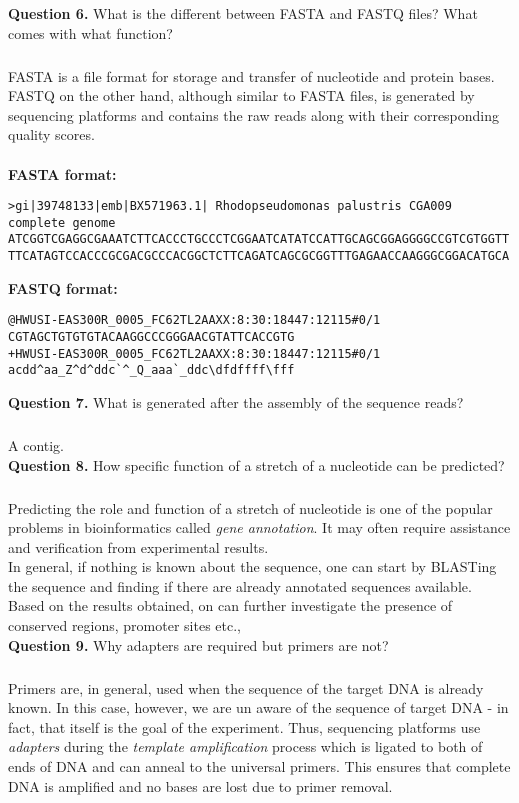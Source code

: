 \documentclass[12pt,a4paper]{report}
\begin{document}
\noindent
\textbf{Question 6.} What is the different between FASTA and FASTQ files? What 
comes with what function?
\subparagraph{} FASTA is a file format for storage and transfer of nucleotide 
and protein bases. FASTQ on the other hand, although similar to FASTA files, is 
generated by sequencing platforms and contains the raw reads along with their 
corresponding quality scores.\mbox{}\\\\
\textbf{FASTA format:}
\begin{verbatim}
>gi|39748133|emb|BX571963.1| Rhodopseudomonas palustris CGA009 complete genome
ATCGGTCGAGGCGAAATCTTCACCCTGCCCTCGGAATCATATCCATTGCAGCGGAGGGGCCGTCGTGGTT
TTCATAGTCCACCCGCGACGCCCACGGCTCTTCAGATCAGCGCGGTTTGAGAACCAAGGGCGGACATGCA
\end{verbatim}
\textbf{FASTQ format:}
\begin{verbatim}
@HWUSI-EAS300R_0005_FC62TL2AAXX:8:30:18447:12115#0/1
CGTAGCTGTGTGTACAAGGCCCGGGAACGTATTCACCGTG
+HWUSI-EAS300R_0005_FC62TL2AAXX:8:30:18447:12115#0/1
acdd^aa_Z^d^ddc`^_Q_aaa`_ddc\dfdffff\fff
\end{verbatim}
\noindent
\textbf{Question 7.} What is generated after the assembly of the sequence reads?
\subparagraph{} A contig.\mbox{}\\

\noindent
\textbf{Question 8.} How specific function of a stretch of a nucleotide can be
predicted?
\subparagraph{} Predicting the role and function of a stretch of nucleotide is 
one of the popular problems in bioinformatics called \textit{gene annotation}. 
It may often require assistance and verification from experimental results. \\ 
In general, if nothing is known about the sequence, one can start by BLASTing 
the sequence and finding if there are already annotated sequences available. 
Based on the results obtained, on can further investigate the presence of
conserved regions, promoter sites etc.,\mbox{}\\

\noindent
\textbf{Question 9.} Why adapters are required but primers are not?
\subparagraph{} Primers are, in general, used when the sequence of the target 
DNA is already known. In this case, however, we are un aware of the sequence of 
target DNA - in fact, that itself is the goal of the experiment. Thus, 
sequencing platforms use \textit{adapters} during the \textit{template 
amplification} process which is ligated to both of ends of DNA and can anneal 
to the universal primers. This ensures that complete DNA is amplified and no 
bases are lost due to primer removal.\mbox{}\\
\end{document}
